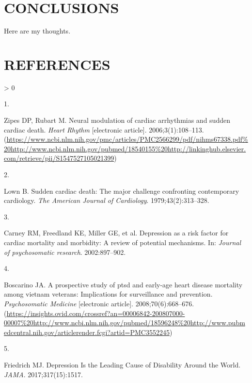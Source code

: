 \documentclass[
  11pt,
  openany]{book}
\newlength{\cslhangindent}
\newlength{\csllabelwidth}
\newenvironment{CSLReferences}[2] %
 {%
  \setlength{\parindent}{0pt}
  \ifodd #1 \everypar{\setlength{\hangindent}{\cslhangindent}}\ignorespaces\fi
  \ifnum #2 > 0
  \setlength{\parskip}{#2\baselineskip}
  \fi
 }%
 {}
\newcommand{\CSLLeftMargin}[1]{\parbox[t]{\csllabelwidth}{#1}}
\newcommand{\CSLRightInline}[1]{\parbox[t]{\linewidth - \csllabelwidth}{#1}\break}
\begin{document}
\hypertarget{part-conclusions}{%
\part*{CONCLUSIONS}\label{part-conclusions}}

Here are my thoughts.

\hypertarget{part-references}{%
\part*{REFERENCES}\label{part-references}}

\bgroup
\singlespacing

\hypertarget{refs}{}
\begin{CSLReferences}{0}{0}
\leavevmode\hypertarget{ref-Zipes2006}{}%
\CSLLeftMargin{1. }
\CSLRightInline{Zipes DP, Rubart M. {Neural modulation of cardiac arrhythmias and sudden cardiac death}. \emph{Heart Rhythm} {[}electronic article{]}. 2006;3(1):108--113. (\url{https://www.ncbi.nlm.nih.gov/pmc/articles/PMC2566299/pdf/nihms67338.pdf\%20http://www.ncbi.nlm.nih.gov/pubmed/18540155\%20http://linkinghub.elsevier.com/retrieve/pii/S1547527105021399})}

\leavevmode\hypertarget{ref-Lown1979}{}%
\CSLLeftMargin{2. }
\CSLRightInline{Lown B. {Sudden cardiac death: The major challenge confronting contemporary cardiology}. \emph{The American Journal of Cardiology}. 1979;43(2):313--328. }

\leavevmode\hypertarget{ref-Carney2002}{}%
\CSLLeftMargin{3. }
\CSLRightInline{Carney RM, Freedland KE, Miller GE, et al. {Depression as a risk factor for cardiac mortality and morbidity: A review of potential mechanisms}. In: \emph{Journal of psychosomatic research}. 2002:897--902.}

\leavevmode\hypertarget{ref-Boscarino2008}{}%
\CSLLeftMargin{4. }
\CSLRightInline{Boscarino JA. {A prospective study of ptsd and early-age heart disease mortality among vietnam veterans: Implications for surveillance and prevention}. \emph{Psychosomatic Medicine} {[}electronic article{]}. 2008;70(6):668--676. (\url{https://insights.ovid.com/crossref?an=00006842-200807000-00007\%20http://www.ncbi.nlm.nih.gov/pubmed/18596248\%20http://www.pubmedcentral.nih.gov/articlerender.fcgi?artid=PMC3552245})}

\leavevmode\hypertarget{ref-Friedrich2017b}{}%
\CSLLeftMargin{5. }
\CSLRightInline{Friedrich MJ. {Depression Is the Leading Cause of Disability Around the World}. \emph{JAMA}. 2017;317(15):1517. }


\end{CSLReferences}
\end{document}
